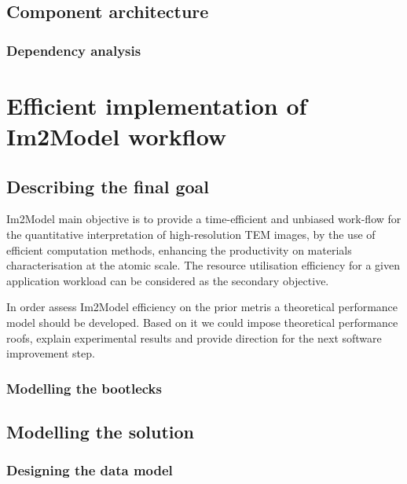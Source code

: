 \documentclass[
  oneside,
  11pt, a4paper,
  footinclude=true,
  headinclude=true,
  cleardoublepage=empty
]{scrbook}
\begin{document}
		\section{Component architecture}

			\subsection{Dependency analysis}





\chapter{Efficient implementation of Im2Model workflow}
		    \section{Describing the final goal}
		    Im2Model main objective is to provide a time-efficient and
unbiased work-flow for the quantitative interpretation of high-resolution TEM images, by the use of
efficient computation methods, enhancing the productivity on materials characterisation at the atomic
scale.
The resource utilisation efficiency for a given application workload
can be considered as the secondary objective.\par 
	
	In order assess Im2Model efficiency on the prior metris  a theoretical performance model should be developed. Based on it we could impose theoretical performance roofs, explain experimental results and provide direction for the next software improvement step.
	
		    \subsection{Modelling the bootlecks}

		    \section{Modelling the solution}
		    \subsection{Designing the data model}
\end{document}
